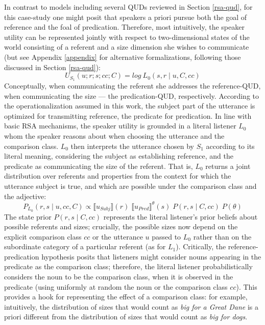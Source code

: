 In contrast to models including several QUDs reviewed in Section \ref{rsa-qud}, for this case-study one might posit that speakers a priori pursue both the goal of reference and the foal of predication. Therefore, most intuitively, the speaker utility can be represented jointly with respect to two-dimensional states of the world consisting of a referent and a size dimension she wishes to communicate (but see Appendix \ref{appendix} for alternative formalizations, following those discussed in Section \ref{rsa-qud}): 
\begin{equation}
\label{model1}
U_{S_1} (u; r; s; cc; C) = log \: L_0 (s, r \mid u, C, cc) 
\end{equation}
Conceptually, when communicating the referent she addresses the reference-QUD, when communicating the size --- the predication-QUD, respectively. According to the operationalization assumed in this work, the subject part of the utterance is optimized for transmitting reference, the predicate for predication.
In line with basic RSA mechanisms, the speaker utility is grounded in a literal listener $L_0$ whom the speaker reasons about when choosing the utterance and the comparison class. 
$L_0$ then interprets the utterance chosen by $S_1$ according to its literal meaning, considering the subject as establishing reference, and the predicate as communicating the size of the referent. 
That is, $L_0$ returns a joint distribution over referents and properties from the context for which the utterance subject is true, and which are possible under the comparison class and the adjective: %
\begin{equation}
P_{L_0} (r, s \mid u, cc, C) \propto \llbracket u_{Subj} \rrbracket (r)  \;  \llbracket u_{Pred} \rrbracket^{\theta} (s) \; P(r, s \mid C, cc) \; P(\theta)
\end{equation}
The state prior $P(r, s \mid C, cc)$ represents the literal listener's prior beliefs about possible referents and sizes; crucially, the possible sizes now depend on the explicit comparison class $cc$ or the utterance $u$ passed to $L_0$ rather than on the subordinate category of a particular referent (as for $L_1$). Critically, the reference-predication hypothesis posits that listeners might consider nouns appearing in the predicate as the comparison class; therefore, the literal listener probabilistically considers the noun to be the comparison class, when it is observed in the predicate (using uniformly at random the noun or the comparison class $cc$). This provides a hook for representing the effect of a comparison class: for example, intuitively, the distribution of sizes that would count as \emph{big for a Great Dane} is a priori different from the distribution of sizes that would count as \emph{big for dogs}. 
